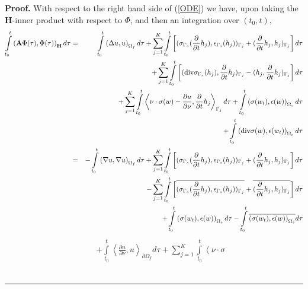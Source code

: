 \documentclass[11pt]{article}
\newenvironment{proof}[1][Proof]{\textbf{#1.} }{\ \rule{0.5em}{0.5em}}
\begin{document}
\begin{proof}
With respect to the right hand side of (\ref{ODE}) we have, upon taking the $\mathbf{H}$-inner product with respect to $\Phi$, and then an
integration over $(t_0,t),$%
\begin{eqnarray*}
\int\limits_{t_{0}}^{t}\left( \mathbf{A}\Phi (\tau ),\Phi (\tau )\right) _{%
\mathbf{H}}d\tau  &=&\int\limits_{t_{0}}^{t}\left( \Delta u,u\right)
_{\Omega _{f}}d\tau +\sum\limits_{j=1}^{K}\int\limits_{t_{0}}^{t}\left[
(\sigma _{\Gamma _{s}}(\frac{\partial }{\partial t}h_{j}),\epsilon _{\Gamma
_{s}}(h_{j}))_{\Gamma _{j}}+(\frac{\partial }{\partial t}h_{j},h_{j})_{%
\Gamma _{j}}\right] d\tau  \\
&&+\sum\limits_{j=1}^{K}\int\limits_{t_{0}}^{t}\left[ (\text{div}\sigma
_{\Gamma _{s}}(h_{j}),\frac{\partial }{\partial t}h_{j})_{\Gamma
_{j}}-(h_{j},\frac{\partial }{\partial t}h_{j})_{\Gamma _{j}}\right] d\tau 
\\
&&+\sum\limits_{j=1}^{K}\int\limits_{t_{0}}^{t}\left\langle \nu \cdot
\sigma (w)-\frac{\partial u}{\partial \nu },\frac{\partial }{\partial t}h_{j}\right\rangle _{\Gamma
_{j}}d\tau +\int\limits_{t_{0}}^{t}\left( \sigma (w_{t}),\epsilon
(w)\right) _{\Omega _{s}}d\tau  \\
&&+\int\limits_{t_{0}}^{t}\left( \text{div}\sigma (w),\epsilon
(w_{t})\right) _{\Omega _{s}}d\tau  \\
&=&-\int\limits_{t_{0}}^{t}\left( \nabla u,\nabla u\right) _{\Omega
_{f}}d\tau +\sum\limits_{j=1}^{K}\int\limits_{t_{0}}^{t}\left[ (\sigma
_{\Gamma _{s}}(\frac{\partial }{\partial t}h_{j}),\epsilon _{\Gamma
_{s}}(h_{j}))_{\Gamma _{j}}+(\frac{\partial }{\partial t}h_{j},h_{j})_{%
\Gamma _{j}}\right] d\tau \\
 &&-\sum\limits_{j=1}^{K}\int\limits_{t_{0}}^{t}\left[ \overline{(\sigma
_{\Gamma _{s}}(\frac{\partial }{\partial t}h_{j}),\epsilon _{\Gamma
_{s}}(h_{j}))_{\Gamma _{j}}}+\overline{(\frac{\partial }{\partial t}%
h_{j},h_{j})_{\Gamma _{j}}}\right] d\tau \\
&&+\int\limits_{t_{0}}^{t}\left( \sigma (w_{t}),\epsilon (w)\right)
_{\Omega _{s}}d\tau -\int\limits_{t_{0}}^{t}\overline{\left( \sigma
(w_{t}),\epsilon (w)\right) _{\Omega _{s}}}d\tau \\
 \end{eqnarray*}
\begin{eqnarray*}
&&+\int\limits_{t_{0}}^{t}\left\langle \frac{\partial u}{\partial \nu }%
,u\right\rangle _{\partial \Omega _{f}}d\tau
+\sum\limits_{j=1}^{K}\int\limits_{t_{0}}^{t}\left\langle \nu \cdot \sigma

\end{eqnarray*}
\end{proof}
\end{document}
